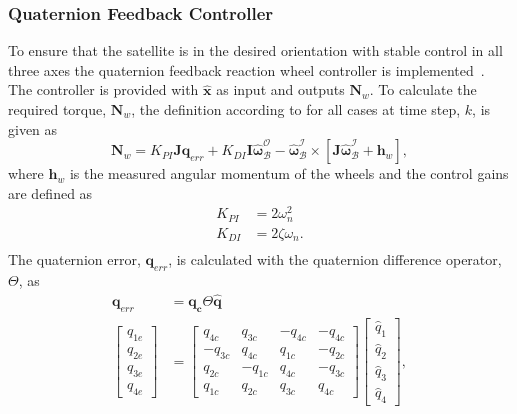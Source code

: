 \subsubsection{Quaternion Feedback Controller}
\label{section: Quaternion Feedback Controller}
To ensure that the satellite is in the desired orientation with stable control in all three axes the quaternion feedback reaction wheel controller is implemented~\cite{wie1989quarternion}. The controller is provided with $\mathbf{\hat{x}}$ as input and outputs $\mathbf{N}_w$. To calculate the required torque, $\mathbf{N}_{w}$, the definition according to \cite{steyn2008attitude} for all cases at time step, $k$, is given as
\begin{equation}
	\mathbf{N}_{w} = K_{PI}\mathbf{Jq}_{err} + K_{DI}\mathbf{I}\hat{\boldsymbol{\omega}}_{\mathcal{B}}^{\mathcal{O}} - \hat{\boldsymbol{\omega}}_{\mathcal{B}}^{\mathcal{I}} \times \left[\mathbf{J}\hat{\boldsymbol{\omega}}_{\mathcal{B}}^{\mathcal{I}} + \mathbf{h}_{w}\right],
\end{equation}
where $\mathbf{h}_{w}$ is the measured angular momentum of the wheels and the control gains are defined as
\begin{equation}
	\begin{aligned}
		K_{PI} &= 2 \omega_n^2\\
		K_{DI} &= 2 \zeta \omega_n. \\
	\end{aligned}
	\label{eq:controlGain}
\end{equation}
The quaternion error, $\mathbf{q}_{err}$, is calculated with the quaternion difference operator, $\Theta$, as
\begin{equation}
	\begin{aligned}
		\mathbf{q}_{err} &= \mathbf{q_c} \Theta \hat{\mathbf{q}} \\
		\begin{bmatrix} 
			q_{1e} \\
			q_{2e} \\
			q_{3e} \\
			q_{4e}
		\end{bmatrix} &= \begin{bmatrix} 
			q_{4c} & q_{3c} & -q_{4c} & -q_{4c} \\
			-q_{3c} & q_{4c} & q_{1c} & -q_{2c} \\
			q_{2c} & - q_{1c} & q_{4c} & -q_{3c} \\
			q_{1c} & q_{2c} & q_{3c} & q_{4c}
		\end{bmatrix}
		\begin{bmatrix} 
			\hat{q}_1 \\
			\hat{q}_2 \\
			\hat{q}_3 \\
			\hat{q}_4
		\end{bmatrix},
	\end{aligned}
	\label{eq:quaternionError}
\end{equation}
